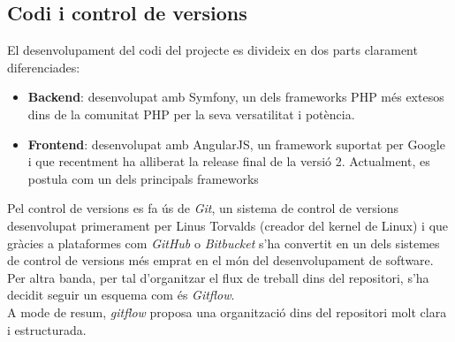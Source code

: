 \subsection{Codi i control de versions}
El desenvolupament del codi del projecte es divideix en dos parts clarament diferenciades:
\begin{itemize}
	\item \textbf{Backend}: desenvolupat amb Symfony, un dels frameworks PHP més extesos dins de la comunitat PHP per la seva versatilitat i potència.
	\item \textbf{Frontend}: desenvolupat amb AngularJS, un framework suportat per Google i  que recentment ha alliberat la release final de la versió 2. Actualment, es postula com un dels principals frameworks 
\end{itemize}

Pel control de versions es fa ús de \textit{Git}\cite{git}, un sistema de control de versions desenvolupat primerament per Linus Torvalds (creador del kernel de Linux) i que gràcies a plataformes com \textit{GitHub} o \textit{Bitbucket} s'ha convertit en un dels sistemes de control de versions més emprat en el món del desenvolupament de software.\\
\newline Per altra banda, per tal d'organitzar el flux de treball dins del repositori, s'ha decidit seguir un esquema com és \textit{Gitflow}\cite{gitflow}.\\
A mode de resum, \textit{gitflow} proposa una organització dins del repositori molt clara i estructurada. \\

